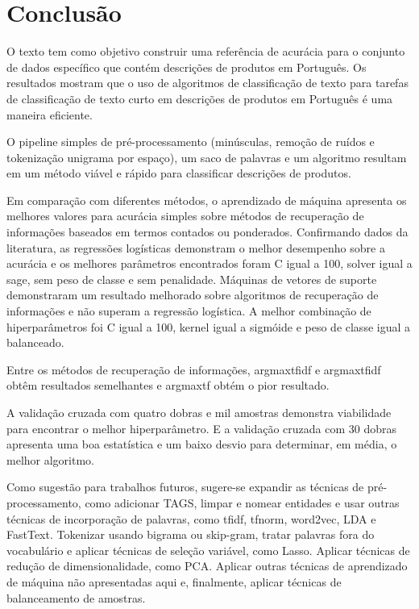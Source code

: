 \chapter{Conclusão}


O texto tem como objetivo construir uma referência de acurácia para o conjunto de dados específico que contém descrições de produtos em Português. Os resultados mostram que o uso de algoritmos de classificação de texto para tarefas de classificação de texto curto em descrições de produtos em Português é uma maneira eficiente.


O pipeline simples de pré-processamento (minúsculas, remoção de ruídos e tokenização unigrama por espaço), um saco de palavras e um algoritmo resultam em um método viável e rápido para classificar descrições de produtos.

Em comparação com diferentes métodos, o aprendizado de máquina apresenta os melhores valores para acurácia simples sobre métodos de recuperação de informações baseados em termos contados ou ponderados. Confirmando dados da literatura, as regressões logísticas demonstram o melhor desempenho sobre a acurácia e os melhores parâmetros encontrados foram C igual a 100, solver igual a sage, sem peso de classe e sem penalidade. Máquinas de vetores de suporte demonstraram um resultado melhorado sobre algoritmos de recuperação de informações e não superam a regressão logística. A melhor combinação de hiperparâmetros foi C igual a 100, kernel igual a sigmóide e peso de classe igual a balanceado.


Entre os métodos de recuperação de informações, argmaxtfidf e argmaxtfidf obtêm resultados semelhantes e argmaxtf obtém o pior resultado.


A validação cruzada com quatro dobras e mil amostras demonstra viabilidade para encontrar o melhor hiperparâmetro. E a validação cruzada com 30 dobras apresenta uma boa estatística e um baixo desvio para determinar, em média, o melhor algoritmo.

Como sugestão para trabalhos futuros, sugere-se expandir as técnicas de pré-processamento, como adicionar TAGS, limpar e nomear entidades e usar outras técnicas de incorporação de palavras, como tfidf, tfnorm, word2vec, LDA e FastText. Tokenizar usando bigrama ou skip-gram, tratar palavras fora do vocabulário e aplicar técnicas de seleção variável, como Lasso. Aplicar técnicas de redução de dimensionalidade, como PCA. Aplicar outras técnicas de aprendizado de máquina não apresentadas aqui e, finalmente, aplicar técnicas de balanceamento de amostras.
